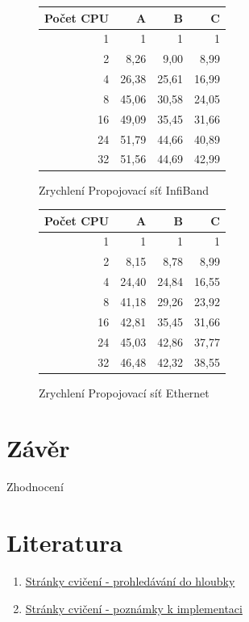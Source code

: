 \documentclass[12pt]{article}
\begin{document}
\begin{figure}
 \caption{Zrychlení Propojovací síť InfiBand}
\begin{tabular}{|r|r|r|r|}
\hline
Počet CPU & A & B & C\\
\hline
1 & 1 & 1 & 1\\
\hline
2 & 8,26 & 9,00 & 8,99\\
\hline
4 & 26,38 & 25,61 & 16,99\\
\hline
8 & 45,06 & 30,58 & 24,05\\
\hline
16 & 49,09 & 35,45 & 31,66\\
\hline
24 & 51,79 & 44,66 & 40,89\\
\hline
32 & 51,56 & 44,69 & 42,99\\
\hline
\end{tabular} 
\end{figure}

\begin{figure}
 \caption{Zrychlení Propojovací síť Ethernet}
\begin{tabular}{|r|r|r|r|}
\hline
Počet CPU & A & B & C\\
\hline
1 & 1 & 1 & 1\\
\hline
2 & 8,15 & 8,78 & 8,99\\
\hline
4 & 24,40 & 24,84 & 16,55\\
\hline
8 & 41,18 & 29,26 & 23,92\\
\hline
16 & 42,81 & 35,45 & 31,66\\
\hline
24 & 45,03 & 42,86 & 37,77\\
\hline
32 & 46,48 & 42,32 & 38,55\\
\hline
\end{tabular} 
\end{figure}

\section{Závěr}
Zhodnocení

\section{Literatura}
\begin{enumerate}
\item \href{https://edux.fit.cvut.cz/courses/MI-PAR/labs/prohledavani_do_hloubky}{Stránky cvičení - prohledávání do hloubky}
\item \href{https://edux.fit.cvut.cz/courses/MI-PAR/labs/poznamky_k_implementaci}{Stránky cvičení - poznámky k implementaci}
\end{enumerate}
\end{document}
